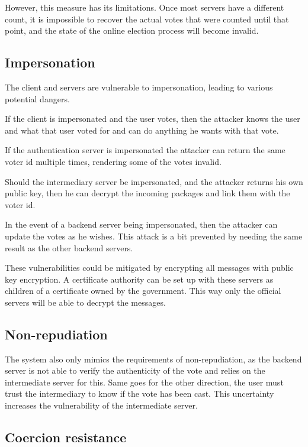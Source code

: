 \documentclass[a4paper,12pt,english]{article}
\begin{document}
However, this measure has its limitations. Once most servers have a different count, it is impossible to recover the actual votes that were counted until that point, and the state of the online election process will become invalid.

\subsection{Impersonation}\label{sec:limit-impersonation}

The client and servers are vulnerable to impersonation, leading to various potential dangers.

If the client is impersonated and the user votes, then the attacker knows the user and what that user voted for and can do anything he wants with that vote.

If the authentication server is impersonated the attacker can return the same voter id multiple times, rendering some of the votes invalid.

Should the intermediary server be impersonated, and the attacker returns his own public key, then he can decrypt the incoming packages and link them with the voter id.

In the event of a backend server being impersonated, then the attacker can update the votes as he wishes. This attack is a bit prevented by needing the same result as the other backend servers.

These vulnerabilities could be mitigated by encrypting all messages with public key encryption. A certificate authority can be set up with these servers as children of a certificate owned by the government. This way only the official servers will be able to decrypt the messages.

\subsection{Non-repudiation}\label{sec:limit-non-repudation}

The system also only mimics the requirements of non-repudiation, as the backend server is not able to verify the authenticity of the vote and relies on the intermediate server for this. Same goes for the other direction, the user must trust the intermediary to know if the vote has been cast. This uncertainty increases the vulnerability of the intermediate server.

\subsection{Coercion resistance}\label{sec:limit-coercion}
\end{document}
